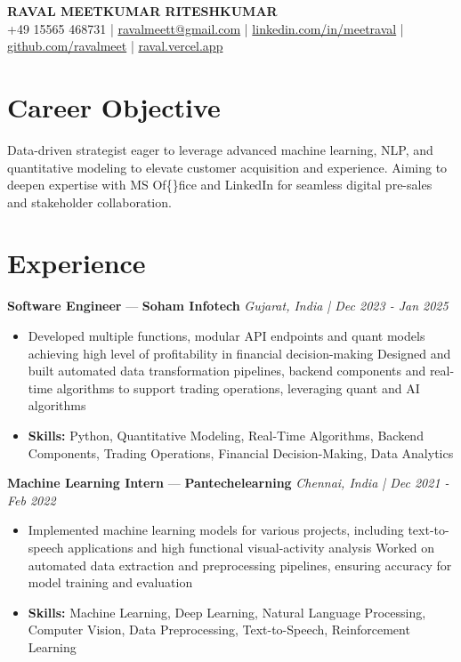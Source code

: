 \documentclass[a4paper,10pt]{article}
\begin{document}
\begin{center}
  {\Large\bfseries RAVAL MEETKUMAR RITESHKUMAR}\\[2pt]
  {\small +49 15565 468731 \;|\; \href{mailto:ravalmeett@gmail.com}{ravalmeett@gmail.com} \;|\; \href{https://www.linkedin.com/in/meetraval/}{linkedin.com/in/meetraval} \;|\; \href{https://github.com/ravalmeet}{github.com/ravalmeet} \;|\; \href{https://raval.vercel.app/}{raval.vercel.app}}
\end{center}
\vspace{-3pt}

\section*{Career Objective}
Data-driven strategist eager to leverage advanced machine learning, NLP, and quantitative modeling to elevate customer acquisition and experience. Aiming to deepen expertise with MS Of\{\}fice and LinkedIn for seamless digital pre-sales and stakeholder collaboration.\par

\section*{Experience}
\textbf{Software Engineer} — \textbf{Soham Infotech} \hfill \textit{Gujarat, India \;|\; Dec 2023 - Jan 2025}\par
\vspace{1pt}
\begin{itemize}
  \item Developed multiple functions, modular API endpoints and quant models achieving high level of profitability in financial decision-making Designed and built automated data transformation pipelines, backend components and real-time algorithms to support trading operations, leveraging quant and AI algorithms
  \item \textbf{Skills:} Python, Quantitative Modeling, Real-Time Algorithms, Backend Components, Trading Operations, Financial Decision-Making, Data Analytics
\end{itemize}
\vspace{3pt}
\textbf{Machine Learning Intern} — \textbf{Pantechelearning} \hfill \textit{Chennai, India \;|\; Dec 2021 - Feb 2022}\par
\vspace{1pt}
\begin{itemize}
  \item Implemented machine learning models for various projects, including text-to-speech applications and high functional visual-activity analysis Worked on automated data extraction and preprocessing pipelines, ensuring accuracy for model training and evaluation
  \item \textbf{Skills:} Machine Learning, Deep Learning, Natural Language Processing, Computer Vision, Data Preprocessing, Text-to-Speech, Reinforcement Learning
\end{itemize}
\end{document}

